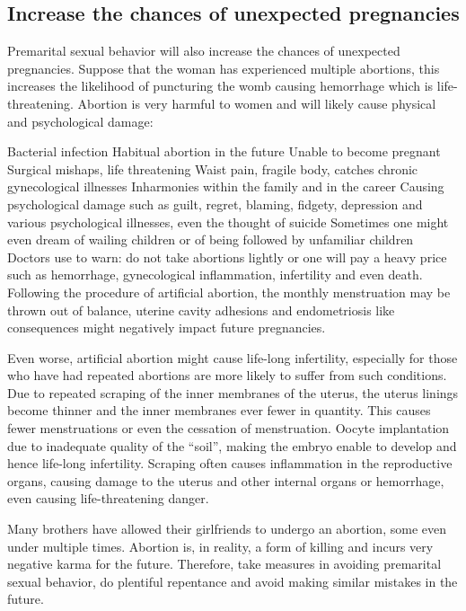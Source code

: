 \documentclass[
]{book}
\begin{document}
\hypertarget{increase-the-chances-of-unexpected-pregnancies}{%
\subsection{Increase the chances of unexpected pregnancies}\label{increase-the-chances-of-unexpected-pregnancies}}

Premarital sexual behavior will also increase the chances of unexpected pregnancies. Suppose that the woman has experienced multiple abortions, this increases the likelihood of puncturing the womb causing hemorrhage which is life-threatening. Abortion is very harmful to women and will likely cause physical and psychological damage:

Bacterial infection
Habitual abortion in the future
Unable to become pregnant
Surgical mishaps, life threatening
Waist pain, fragile body, catches chronic gynecological illnesses
Inharmonies within the family and in the career
Causing psychological damage such as guilt, regret, blaming, fidgety, depression and various psychological illnesses, even the thought of suicide
Sometimes one might even dream of wailing children or of being followed by unfamiliar children
Doctors use to warn: do not take abortions lightly or one will pay a heavy price such as hemorrhage, gynecological inflammation, infertility and even death. Following the procedure of artificial abortion, the monthly menstruation may be thrown out of balance, uterine cavity adhesions and endometriosis like consequences might negatively impact future pregnancies.

Even worse, artificial abortion might cause life-long infertility, especially for those who have had repeated abortions are more likely to suffer from such conditions. Due to repeated scraping of the inner membranes of the uterus, the uterus linings become thinner and the inner membranes ever fewer in quantity. This causes fewer menstruations or even the cessation of menstruation. Oocyte implantation due to inadequate quality of the ``soil'', making the embryo enable to develop and hence life-long infertility. Scraping often causes inflammation in the reproductive organs, causing damage to the uterus and other internal organs or hemorrhage, even causing life-threatening danger.

Many brothers have allowed their girlfriends to undergo an abortion, some even under multiple times. Abortion is, in reality, a form of killing and incurs very negative karma for the future. Therefore, take measures in avoiding premarital sexual behavior, do plentiful repentance and avoid making similar mistakes in the future.
\end{document}
